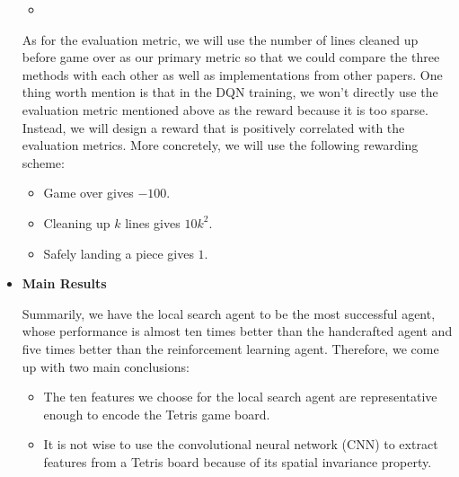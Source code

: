 \documentclass[letterpaper]{article} %
\begin{document}
\begin{itemize}
\begin{itemize}
    \item {}
  
\end{itemize}
{As for the evaluation metric, we will use the number of lines cleaned up before game over as our primary metric so that we could compare the three methods with each other as well as implementations from other papers. One thing worth mention is that in the DQN training, we won't directly use the evaluation metric mentioned above as the reward because it is too sparse. Instead, we will design a reward that is positively correlated with the evaluation metrics. More concretely, we will use the following rewarding scheme:}
\begin{itemize}
  \item Game over gives $-100$.
  \item Cleaning up $k$ lines gives $10k^{2}$.
  \item Safely landing a piece gives $1$.
\end{itemize}

\item 
{\bf Main Results}

Summarily, we have the local search agent to be the most successful agent, whose performance is almost ten times better than the handcrafted agent and five times better than the reinforcement learning agent. Therefore, we come up with two main conclusions:
\begin{itemize}
  \item 
  The ten features we choose for the local search agent are representative enough to encode the Tetris game board.
  \item 
  It is not wise to use the convolutional neural network (CNN) to extract features from a Tetris board because of its spatial invariance property.
\end{itemize}


\end{itemize}
\end{document}
